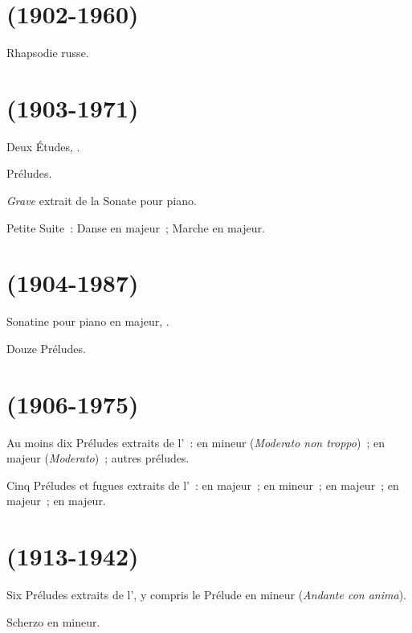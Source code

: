 \section[%
Vladimir Krjukov (1902-1960)]{%
\VKrioukov{} (1902-1960)}

Rhapsodie russe.

\section[%
Valerian Bogdanov-Berezovskij (1903-1971)]{%
\VBogdanovBerezovsky{} (1903-1971)}

Deux Études, .

Préludes.

\emph{Grave} extrait de la Sonate pour piano.

Petite Suite~:  Danse en \kA majeur~;  Marche en \kD
majeur.

\section[%
Dmitrij Kabalevskij (1904-1987)]{%
\DKabalevski{} (1904-1987)}

Sonatine pour piano  en \kC majeur,  .

Douze Préludes.

\section[%
Dmitrij Šostakovič (1906-1975)]{%
\DChostakovitch{} (1906-1975)}

Au moins dix Préludes extraits de l'~:  en \kC \Sharp
mineur (\emph{Moderato non troppo})~;  en \kF \Sharp majeur
(\emph{Moderato})~; autres préludes.

Cinq Préludes et fugues extraits de l'~:  en \kC majeur~;
 en \kA mineur~;  en \kG majeur~;  en \kA
majeur~;  en \kE majeur.

\section[%
Boris Gol'c (1913-1942)]{%
\BGoltz{} (1913-1942)}

Six Préludes extraits de l', y compris le Prélude  en \kE
mineur (\emph{Andante con anima}).

Scherzo en \kE mineur.
